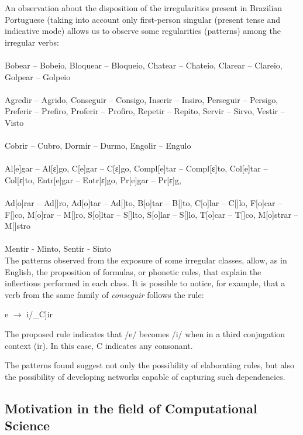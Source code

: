 An observation about the disposition of the irregularities present in Brazilian Portuguese (taking into account only first-person singular (present tense and indicative mode) allows us to observe some regularities (patterns) among the irregular verbs:\\
\\
Bobear – Bobeio, Bloquear – Bloqueio, Chatear – Chateio, Clarear – Clareio, Golpear – Golpeio\\
\\
Agredir – Agrido, Conseguir – Consigo, Inserir – Insiro, Perseguir – Persigo, Preferir – Prefiro, Proferir – Profiro, Repetir – Repito, Servir –  Sirvo, Vestir – Visto\\
\\
Cobrir – Cubro, Dormir – Durmo, Engolir – Engulo\\
\\
 Al[e]gar – Al[ε]go, C[e]gar – C[ε]go, Compl[e]tar – Compl[ε]to,  Col[e]tar – Col[ε]to, Entr[e]gar – Entr[ε]go, Pr[e]gar – Pr[ε]g,\\
\\
Ad[o]rar – Ad[\textopeno]ro, Ad[o]tar – Ad[\textopeno]to, B[o]tar – B[\textopeno]to, C[o]lar – C[\textopeno]lo, F[o]car – F[\textopeno]co, M[o]rar – M[\textopeno]ro, S[o]ltar – S[\textopeno]lto, S[o]lar – S[\textopeno]lo, T[o]car – T[\textopeno]co, M[o]strar – M[\textopeno]stro\\
\\
Mentir - Minto, Sentir - Sinto\\

The patterns observed from the exposure of some irregular classes, allow, as in English, the proposition of formulas, or phonetic rules, that explain the inflections performed in each class. It is possible to notice, for example, that a verb from the same family of \textit{conseguir} follows the rule:

\begin{center}
e $\rightarrow$ i/\_C]ir 
\end{center}

The proposed rule indicates that /e/ becomes /i/ when in a third conjugation context (ir). In this case, C indicates any consonant.

The patterns found suggest not only the possibility of elaborating rules, but also the possibility of developing networks capable of capturing such dependencies.

\subsection{Motivation in the field of Computational Science}
\label{sec:compmot}

